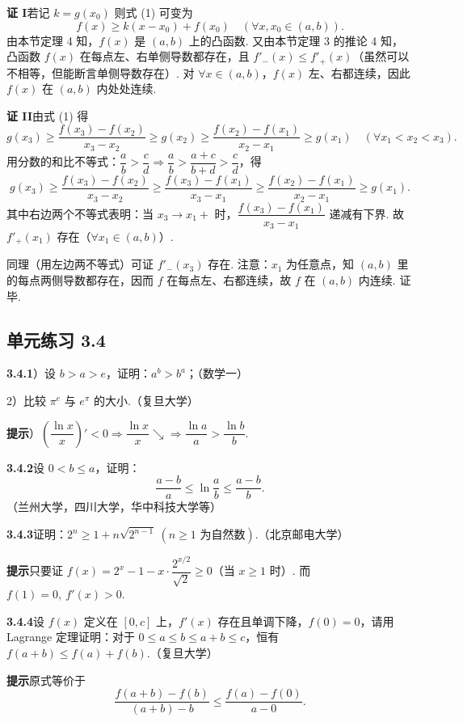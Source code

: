 \documentclass[UTF8,12pt,a4paper,fontset=fandol]{ctexart}
\begin{document}
\noindent\textbf{证 I}\quad 若记 $k=g(x_0)$ 则式 (1) 可变为
\[
  f(x)\ge k(x-x_0)+f(x_0)\quad(\forall x,x_0\in(a,b)).
\]
由本节定理 4 知，$f(x)$ 是 $(a,b)$ 上的凸函数. 又由本节定理 3 的推论 4 知，凸函数 $f(x)$ 在每点左、右单侧导数都存在，且 $f'_-(x)\le f'_+(x)$（虽然可以不相等，但能断言单侧导数存在）. 对 $\forall x\in(a,b)$，$f(x)$ 左、右都连续，因此 $f(x)$ 在 $(a,b)$ 内处处连续.

\noindent\textbf{证 II}\quad 由式 (1) 得
\[
  g(x_3)\ge \frac{f(x_3)-f(x_2)}{x_3-x_2}
  \ge g(x_2)\ge \frac{f(x_2)-f(x_1)}{x_2-x_1}
  \ge g(x_1)\quad(\forall x_1<x_2<x_3).
\]
用分数的和比不等式：$\dfrac ab>\dfrac cd\Rightarrow\dfrac ab>\dfrac{a+c}{b+d}>\dfrac cd$，得
\[
  g(x_3)\ge \frac{f(x_3)-f(x_2)}{x_3-x_2}
  \ge \frac{f(x_3)-f(x_1)}{x_3-x_1}
  \ge \frac{f(x_2)-f(x_1)}{x_2-x_1}
  \ge g(x_1).
\]
其中右边两个不等式表明：当 $x_3\to x_1+$ 时，$\dfrac{f(x_3)-f(x_1)}{x_3-x_1}$ 递减有下界. 故 $f'_+(x_1)$ 存在（$\forall x_1\in(a,b)$）.

同理（用左边两不等式）可证 $f'_-(x_3)$ 存在. 注意：$x_1$ 为任意点，知 $(a,b)$ 里的每点两侧导数都存在，因而 $f$ 在每点左、右都连续，故 $f$ 在 $(a,b)$ 内连续. 证毕.

\subsection*{单元练习 3.4}

\noindent\textbf{3.4.1}）设 $b>a>e$，证明：$a^b>b^a$；（数学一）

2）比较 $\pi^e$ 与 $e^\pi$ 的大小.（复旦大学）

\noindent\textbf{提示}）$\left(\dfrac{\ln x}{x}\right)'<0\Rightarrow\dfrac{\ln x}{x}\searrow\Rightarrow\dfrac{\ln a}{a}>\dfrac{\ln b}{b}$.

\noindent\textbf{3.4.2}\quad 设 $0<b\le a$，证明：
\[
  \frac{a-b}{a}\le\ln\frac ab\le\frac{a-b}{b}.
\]
（兰州大学，四川大学，华中科技大学等）

\noindent\textbf{3.4.3}\quad 证明：$2^n\ge1+n\sqrt{2^{n-1}}\ (n\ge1\text{ 为自然数})$.（北京邮电大学）

\noindent\textbf{提示}\quad 只要证 $f(x)=2^x-1-x\cdot\dfrac{2^{x/2}}{\sqrt2}\ge0$（当 $x\ge1$ 时）. 而 $f(1)=0,\ f'(x)>0$.

\noindent\textbf{3.4.4}\quad 设 $f(x)$ 定义在 $[0,c]$ 上，$f'(x)$ 存在且单调下降，$f(0)=0$，请用 Lagrange 定理证明：对于 $0\le a\le b\le a+b\le c$，恒有 $f(a+b)\le f(a)+f(b)$.（复旦大学）

\noindent\textbf{提示}\quad 原式等价于
\[
  \frac{f(a+b)-f(b)}{(a+b)-b}\le\frac{f(a)-f(0)}{a-0}.
\]
\end{document}

